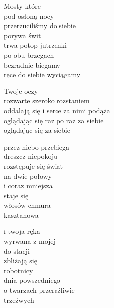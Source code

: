 \begin{text}
    Mosty które\\
    pod osłoną nocy\\
    przerzuciliśmy do siebie\\
    porywa świt\\
    trwa potop jutrzenki\\
    po obu brzegach\\
    bezradnie biegamy\\
    ręce do siebie wyciągamy

    Twoje oczy\\
    rozwarte szeroko rozstaniem\\
    oddalają się i serce za nimi podąża\\
    oglądając się raz po raz za siebie\\
    oglądając się za siebie

    przez niebo przebiega\\
    dreszcz niepokoju\\
    rozstępuje się świat\\
    na dwie połowy\\
    i coraz mniejsza\\
    staje się\\
    włosów chmura\\
    kasztanowa

    i twoja ręka\\
    wyrwana z mojej\\
    do stacji\\
    zbliżają się\\
    robotnicy\\
    dnia powszedniego\\
    o twarzach przeraźliwie\\
    trzeźwych
\end{text}
\begin{chord}

\end{chord}